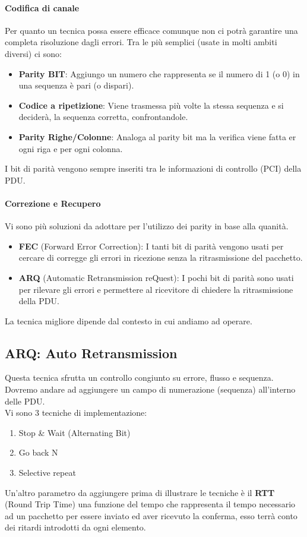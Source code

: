 \documentclass[12pt]{article}
\begin{document}
\paragraph{Codifica di canale} Per quanto un tecnica possa essere efficace comunque non ci potrà garantire una completa risoluzione dagli errori. Tra le più semplici (usate in molti ambiti diversi) ci sono:
\begin{itemize}
  \item \textbf{Parity BIT}: Aggiungo un numero che rappresenta se il numero di 1 (o 0) in una sequenza è pari (o dispari).
  \item \textbf{Codice a ripetizione}: Viene trasmessa più volte la stessa sequenza e si deciderà, la sequenza corretta, confrontandole.
  \item \textbf{Parity Righe/Colonne}: Analoga al parity bit ma la verifica viene fatta er ogni riga e per ogni colonna.
\end{itemize}
I bit di parità vengono sempre inseriti tra le informazioni di controllo (PCI) della PDU.
\paragraph{Correzione e Recupero}
Vi sono più soluzioni da adottare per l'utilizzo dei parity in base alla quanità.
\begin{itemize}
  \item \textbf{FEC} (Forward Error Correction): I tanti bit di parità vengono usati per cercare di corregge gli errori in ricezione senza la ritrasmissione del pacchetto.
  \item \textbf{ARQ} (Automatic Retransmission reQuest): I pochi bit di parità sono usati per rilevare gli errori e permettere al ricevitore di chiedere la ritrasmissione della PDU.
\end{itemize}
La tecnica migliore dipende dal contesto in cui andiamo ad operare.

\subsection{ARQ: Auto Retransmission}
Questa tecnica sfrutta un controllo congiunto su errore, flusso e sequenza. Dovremo andare ad aggiungere un campo di numerazione (sequenza) all'interno delle PDU.\\
Vi sono 3 tecniche di implementazione:
\begin{enumerate}
  \item Stop \& Wait (Alternating Bit)
  \item Go back N
  \item Selective repeat
\end{enumerate}
Un'altro parametro da aggiungere prima di illustrare le tecniche è il \textbf{RTT} (Round Trip Time) una funzione del tempo che rappresenta il tempo necessario ad un pacchetto per essere inviato ed aver ricevuto la conferma, esso terrà conto dei ritardi introdotti da ogni elemento.\\
\end{document}
